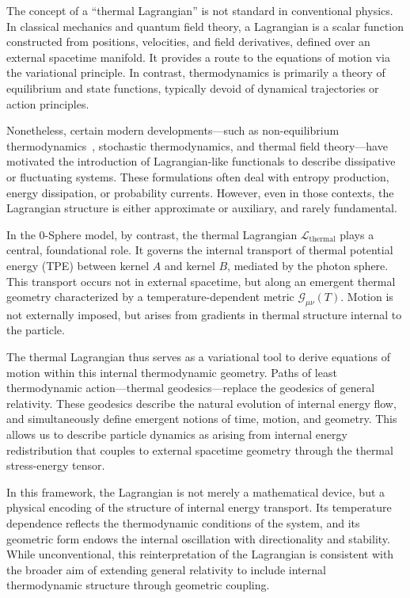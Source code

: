\documentclass[%
 reprint,
 amsmath,amssymb,
 aps,
]{revtex4-1}
\numberwithin{equation}{section}%
\begin{document}
The concept of a ``thermal Lagrangian'' is not standard in conventional physics. In classical mechanics and quantum field theory, a Lagrangian is a scalar function constructed from positions, velocities, and field derivatives, defined over an external spacetime manifold. It provides a route to the equations of motion via the variational principle. In contrast, thermodynamics is primarily a theory of equilibrium and state functions, typically devoid of dynamical trajectories or action principles.

Nonetheless, certain modern developments—such as non-equilibrium thermodynamics~\cite{jarzynski2011}, stochastic thermodynamics, and thermal field theory—have motivated the introduction of Lagrangian-like functionals to describe dissipative or fluctuating systems. These formulations often deal with entropy production, energy dissipation, or probability currents. However, even in those contexts, the Lagrangian structure is either approximate or auxiliary, and rarely fundamental.

In the 0-Sphere model, by contrast, the thermal Lagrangian $\mathcal{L}_{\text{thermal}}$ plays a central, foundational role. It governs the internal transport of thermal potential energy (TPE) between kernel $A$ and kernel $B$, mediated by the photon sphere. This transport occurs not in external spacetime, but along an emergent thermal geometry characterized by a temperature-dependent metric $\mathcal{G}_{\mu\nu}(T)$. Motion is not externally imposed, but arises from gradients in thermal structure internal to the particle.

The thermal Lagrangian thus serves as a variational tool to derive equations of motion within this internal thermodynamic geometry. Paths of least thermodynamic action—thermal geodesics—replace the geodesics of general relativity. These geodesics describe the natural evolution of internal energy flow, and simultaneously define emergent notions of time, motion, and geometry. This allows us to describe particle dynamics as arising from internal energy redistribution that couples to external spacetime geometry through the thermal stress-energy tensor.

In this framework, the Lagrangian is not merely a mathematical device, but a physical encoding of the structure of internal energy transport. Its temperature dependence reflects the thermodynamic conditions of the system, and its geometric form endows the internal oscillation with directionality and stability. While unconventional, this reinterpretation of the Lagrangian is consistent with the broader aim of extending general relativity to include internal thermodynamic structure through geometric coupling.
\end{document}
